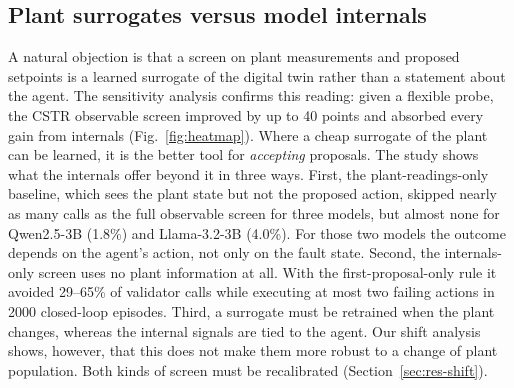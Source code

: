 \subsection{Plant surrogates versus model internals}
A natural objection is that a screen on plant measurements and proposed setpoints is a learned surrogate of the
digital twin rather than a statement about the agent. The sensitivity analysis confirms this reading: given a
flexible probe, the CSTR observable screen improved by up to 40 points and absorbed every gain from internals
(Fig.~\ref{fig:heatmap}). Where a cheap surrogate of the plant can be learned, it is the better tool for
\emph{accepting} proposals. The study shows what the internals offer beyond it in three ways. First, the
plant-readings-only baseline, which sees the plant state but not the proposed action, skipped nearly as many
calls as the full observable screen for three models, but almost none for Qwen2.5-3B (1.8\%) and Llama-3.2-3B
(4.0\%). For those two models the outcome depends on the agent's action, not only on the fault state. Second, the
internals-only screen uses no plant information at all. With the first-proposal-only rule it avoided 29--65\% of
validator calls while executing at most two failing actions in 2000 closed-loop episodes. Third, a surrogate
must be retrained when the plant changes, whereas the internal signals are tied to the agent. Our shift analysis
shows, however, that this does not make them more robust to a change of plant population. Both kinds of screen
must be recalibrated (Section~\ref{sec:res-shift}).

